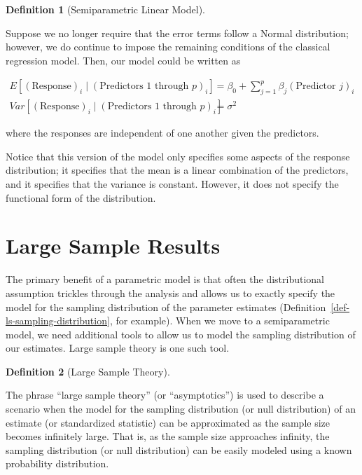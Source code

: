\documentclass[
  letterpaper,
  DIV=11,
  numbers=noendperiod]{scrreprt}
\theoremstyle{definition}
\theoremstyle{definition}
\newtheorem{definition}{Definition}[chapter]
\theoremstyle{remark}
\begin{document}
\begin{definition}[Semiparametric Linear
Model]\protect\hypertarget{def-semiparametric-linear-model}{}\label{def-semiparametric-linear-model}

Suppose we no longer require that the error terms follow a Normal
distribution; however, we do continue to impose the remaining conditions
of the classical regression model. Then, our model could be written as

\[
\begin{aligned}
  E\left[(\text{Response})_i \mid (\text{Predictors 1 through } p)_i\right]
    &= \beta_0 + \sum\limits_{j=1}^{p} \beta_j (\text{Predictor } j)_i \\
  Var\left[(\text{Response})_i \mid (\text{Predictors 1 through } p)_i\right]
    &= \sigma^2
\end{aligned}
\]

where the responses are independent of one another given the predictors.

\end{definition}

Notice that this version of the model only specifies some aspects of the
response distribution; it specifies that the mean is a linear
combination of the predictors, and it specifies that the variance is
constant. However, it does not specify the functional form of the
distribution.

\hypertarget{large-sample-results}{%
\section{Large Sample Results}\label{large-sample-results}}

The primary benefit of a parametric model is that often the
distributional assumption trickles through the analysis and allows us to
exactly specify the model for the sampling distribution of the parameter
estimates (Definition~\ref{def-ls-sampling-distribution}, for example).
When we move to a semiparametric model, we need additional tools to
allow us to model the sampling distribution of our estimates. Large
sample theory is one such tool.

\begin{definition}[Large Sample
Theory]\protect\hypertarget{def-large-sample-theory}{}\label{def-large-sample-theory}

The phrase ``large sample theory'' (or ``asymptotics'') is used to
describe a scenario when the model for the sampling distribution (or
null distribution) of an estimate (or standardized statistic) can be
approximated as the sample size becomes infinitely large. That is, as
the sample size approaches infinity, the sampling distribution (or null
distribution) can be easily modeled using a known probability
distribution.

\end{definition}
\end{document}

